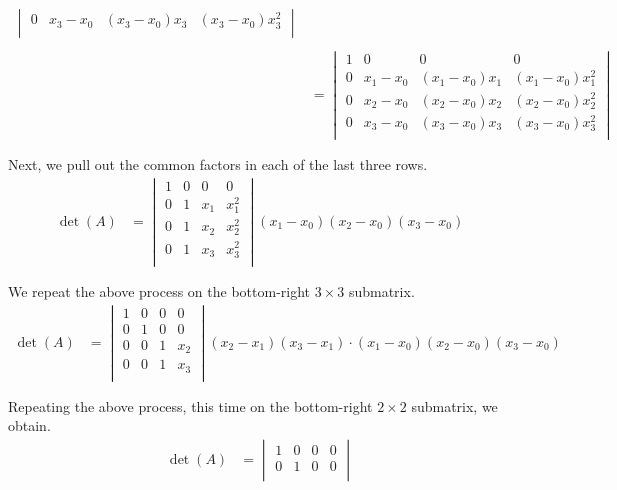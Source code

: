 \documentclass{report}
\begin{document}
\begin{itemize}
$$\begin{align}
\begin{vmatrix}
    0 & x_3-x_0 & (x_3 - x_0)x_3 & (x_3 - x_0)x_3^2\\
\end{vmatrix} \\ \\
& = 
\begin{vmatrix}
    1 & 0 & 0 & 0 \\
    0 & x_1-x_0 & (x_1 - x_0)x_1 & (x_1 - x_0)x_1^2\\
    0 & x_2-x_0 & (x_2 - x_0)x_2 & (x_2 - x_0)x_2^2\\
    0 & x_3-x_0 & (x_3 - x_0)x_3 & (x_3 - x_0)x_3^2\\
\end{vmatrix} \\ \\
    \end{align}
    $$
    \bigbreak \noindent 
    Next, we pull out the common factors in each of the last three rows.
    $$
    \begin{align}
        \det(A)
& = 
\begin{vmatrix}
    1 & 0 & 0 & 0 \\
    0 & 1 & x_1 & x_1^2\\
    0 & 1 & x_2 & x_2^2\\
    0 & 1 & x_3 & x_3^2\\
\end{vmatrix} (x_1-x_0)(x_2-x_0)(x_3-x_0) \\ \\
    \end{align}
    $$
    We repeat the above process on the bottom-right $3 \times 3$ submatrix.
    $$
    \begin{align}
        \det(A)
& = 
\begin{vmatrix}
    1 & 0 & 0 & 0 \\
    0 & 1 & 0 & 0 \\
    0 & 0 & 1 & x_2\\
    0 & 0 & 1 & x_3\\
\end{vmatrix} (x_2-x_1)(x_3-x_1)\cdot(x_1-x_0)(x_2-x_0)(x_3-x_0) \\ \\
    \end{align}
    $$
    \bigbreak \noindent 
    Repeating the above process, this time on the bottom-right $2 \times 2$ submatrix, we obtain.
$$
\begin{align}
\det(A)
& = 
\begin{vmatrix}
1 & 0 & 0 & 0 \\
0 & 1 & 0 & 0 \\

\end{vmatrix}
\end{align}$$
\end{itemize}
\end{document}
